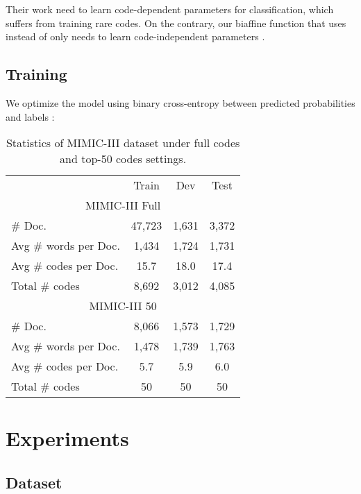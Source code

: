\documentclass[11pt]{article}
\begin{document}
Their work need to learn code-dependent parameters  for classification, which suffers from training rare codes.
On the contrary, our biaffine function that uses  instead of  only needs to learn code-independent parameters .









\subsection{Training} We optimize the model using binary cross-entropy between predicted probabilities  and labels :




\begin{table}[ht]
    \centering
    \small
    \begin{tabular}{lccc}
    \toprule
    & Train & Dev & Test  \\
    \multicolumn{4}{c}{MIMIC-III Full} \\
    \midrule
    \# Doc. & 47,723 & 1,631 & 3,372 \\
    Avg \# words per Doc. & 1,434 & 1,724 & 1,731 \\  
    Avg \# codes per Doc. & 15.7 & 18.0 & 17.4 \\ 
    Total \# codes & 8,692 & 3,012 & 4,085\\ 
    \midrule
    \multicolumn{4}{c}{MIMIC-III 50} \\
    \midrule
    \# Doc. & 8,066 & 1,573 & 1,729 \\
    Avg \# words per Doc. & 1,478 & 1,739 & 1,763 \\
    Avg \# codes per Doc. & 5.7 & 5.9 & 6.0 \\ 
    Total \# codes & 50 & 50 & 50 \\
    \bottomrule
    
    \end{tabular}
    \caption{Statistics of MIMIC-III dataset under full codes and top-50 codes settings.}
    \label{tab:dataset}
\end{table}




\section{Experiments}


\subsection{Dataset}
\end{document}
